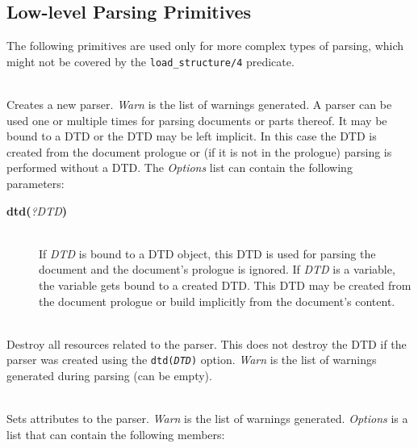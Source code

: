 \subsection{Low-level Parsing Primitives}

The following primitives are used only for more complex types of parsing,
which might not be covered by the {\tt load\_structure/4} predicate. 

\begin{description}
\item[{\bf new\_sgml\_parser}{\bf (}{\it -Parser, +Options, -Warn}{\bf
    )}]\mbox{}\\Creates a new parser. {\it Warn} is the list of warnings
  generated. A parser can be used one or multiple times for parsing
  documents or parts thereof. It may be bound to a DTD or the DTD may be
  left implicit. In this case the DTD is created from the document prologue
  or (if it is not in the prologue) parsing is performed without a DTD.
  The \emph{Options} list can contain the following parameters: 

  \begin{description}
  \item[{\bf dtd}{\bf (}{\it ?DTD}{\bf )}]\mbox{}\\
    If \emph{DTD} is bound to a DTD object, this DTD is used for parsing
    the document and the document's prologue is ignored. If \emph{DTD} is a
    variable, the variable gets bound to a created DTD. This DTD may
    be created from the document prologue or build implicitly from the
    document's content.
  \end{description}



\item[{\bf free\_sgml\_parser}{\bf (}{\it +Parser, -Warn}{\bf
    )}]\mbox{}\\Destroy all resources related to the parser. This does not
  destroy the DTD if the parser was created using the {\tt dtd(\emph{DTD})}
  option. {\it Warn} is the list of warnings generated during parsing (can
    be empty).

\item[{\bf set\_sgml\_parser}{\bf (}{\it +Parser, +Option, -Warn}{\bf
    )}]\mbox{}\\Sets attributes to the parser. {\it Warn} is the list of
  warnings generated. \emph{Options} is a list that can contain the
    following members:


\end{description}
